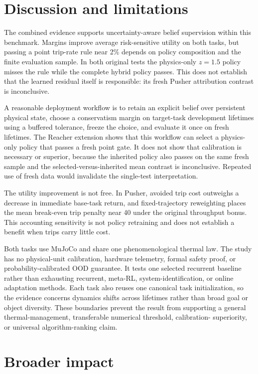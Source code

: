 \section{Discussion and limitations}
\label{sec:discussion}

The combined evidence supports uncertainty-aware belief supervision within
this benchmark. Margins improve average risk-sensitive utility on both tasks,
but passing a point trip-rate rule near 2\% depends on policy composition and
the finite evaluation sample. In both original tests the physics-only
$z=1.5$ policy misses the rule while the complete hybrid policy passes. This
does not establish that the learned residual itself is responsible: its fresh
Pusher attribution contrast is inconclusive.

A reasonable deployment workflow is to retain an explicit belief over
persistent physical state, choose a conservatism margin on target-task
development lifetimes using a buffered tolerance, freeze the choice, and
evaluate it once on fresh lifetimes. The Reacher extension shows that this
workflow can select a physics-only policy that passes a fresh point gate. It
does not show that calibration is necessary or superior, because the inherited
policy also passes on the same fresh sample and the selected-versus-inherited
mean contrast is inconclusive. Repeated use of fresh data would invalidate the
single-test interpretation.

The utility improvement is not free. In Pusher, avoided trip cost outweighs a
decrease in immediate base-task return, and fixed-trajectory reweighting places
the mean break-even trip penalty near 40 under the original throughput bonus.
This accounting sensitivity is not policy retraining and does not establish a
benefit when trips carry little cost.

Both tasks use MuJoCo and share one phenomenological thermal law. The study has
no physical-unit calibration, hardware telemetry, formal safety proof, or
probability-calibrated OOD guarantee. It tests one selected recurrent baseline
rather than exhausting recurrent, meta-RL, system-identification, or online
adaptation methods. Each task also reuses one canonical task initialization,
so the evidence concerns dynamics shifts across lifetimes rather than broad
goal or object diversity. These boundaries prevent the result from supporting
a general thermal-management, transferable numerical threshold, calibration-
superiority, or universal algorithm-ranking claim.

\section{Broader impact}


